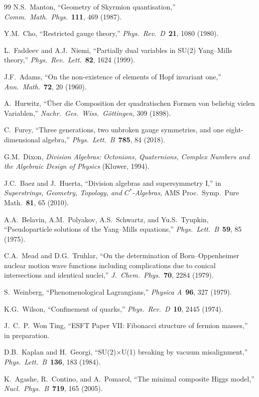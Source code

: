 \documentclass[a4paper,12pt]{article}
\begin{document}
\begin{thebibliography}{99}
 N.S.~Manton,
 ``Geometry of Skyrmion quantisation,''
 \emph{Comm.\ Math.\ Phys.}\ \textbf{111}, 469 (1987).

 Y.M.~Cho,
 ``Restricted gauge theory,''
 \emph{Phys.\ Rev.\ D}\ \textbf{21}, 1080 (1980).

 L.~Faddeev and A.J.~Niemi,
 ``Partially dual variables in SU(2) Yang--Mills theory,''
 \emph{Phys.\ Rev.\ Lett.}\ \textbf{82}, 1624 (1999).

 J.F.~Adams,
 ``On the non-existence of elements of Hopf invariant one,''
 \emph{Ann.\ Math.}\ \textbf{72}, 20 (1960).

 A.~Hurwitz,
 ``\"Uber die Composition der quadratischen Formen von beliebig
 vielen Variablen,''
 \emph{Nachr.\ Ges.\ Wiss.\ G\"ottingen}, 309 (1898).

 C.~Furey,
 ``Three generations, two unbroken gauge symmetries, and one
 eight-dimensional algebra,''
 \emph{Phys.\ Lett.\ B}\ \textbf{785}, 84 (2018).

 G.M.~Dixon,
 \emph{Division Algebras: Octonions, Quaternions, Complex Numbers
 and the Algebraic Design of Physics}
 (Kluwer, 1994).

 J.C.~Baez and J.~Huerta,
 ``Division algebras and supersymmetry I,''
 in \emph{Superstrings, Geometry, Topology, and $C^*$-Algebras},
 AMS Proc.\ Symp.\ Pure Math.\ \textbf{81}, 65 (2010).

 A.A.~Belavin, A.M.~Polyakov, A.S.~Schwartz, and Yu.S.~Tyupkin,
 ``Pseudoparticle solutions of the Yang--Mills equations,''
 \emph{Phys.\ Lett.\ B}\ \textbf{59}, 85 (1975).

 C.A.~Mead and D.G.~Truhlar,
 ``On the determination of Born--Oppenheimer nuclear motion wave
 functions including complications due to conical intersections and
 identical nuclei,''
 \emph{J.\ Chem.\ Phys.}\ \textbf{70}, 2284 (1979).

 S.~Weinberg,
 ``Phenomenological Lagrangians,''
 \emph{Physica A}\ \textbf{96}, 327 (1979).

 K.G.~Wilson,
 ``Confinement of quarks,''
 \emph{Phys.\ Rev.\ D}\ \textbf{10}, 2445 (1974).

 J.~C.~P.~Won Ting,
 ``ESFT Paper VII: Fibonacci structure of fermion masses,'' in preparation.

 D.B.~Kaplan and H.~Georgi,
 ``SU(2)$\times$U(1) breaking by vacuum misalignment,''
 \emph{Phys.\ Lett.\ B}\ \textbf{136}, 183 (1984).

 K.~Agashe, R.~Contino, and A.~Pomarol,
 ``The minimal composite Higgs model,''
 \emph{Nucl.\ Phys.\ B}\ \textbf{719}, 165 (2005).

\end{thebibliography}
\end{document}
